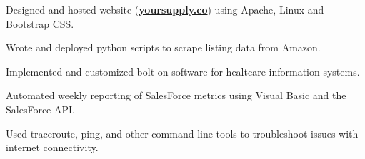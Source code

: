 \documentclass[]{deemweaver}
\begin{document}
\begin{minipage}[t]{0.66\textwidth}
\begin{tightemize}
\item Designed and hosted website (\href{http://yoursupply.co}{\bf yoursupply.co}) using Apache, Linux and Bootstrap CSS.
\item Wrote and deployed python scripts to scrape listing data from Amazon.
\end{tightemize}
\sectionsep


\begin{tightemize}
\item Implemented and customized bolt-on software for healtcare information systems.
\end{tightemize}
\sectionsep

\begin{tightemize}
\item Automated weekly reporting of SalesForce metrics using Visual Basic and the SalesForce API.
\end{tightemize}
\sectionsep

\begin{tightemize}
\item Used traceroute, ping, and other command line tools to troubleshoot issues with internet connectivity.
\end{tightemize}
\sectionsep


%
%


\end{minipage}
\end{document}
